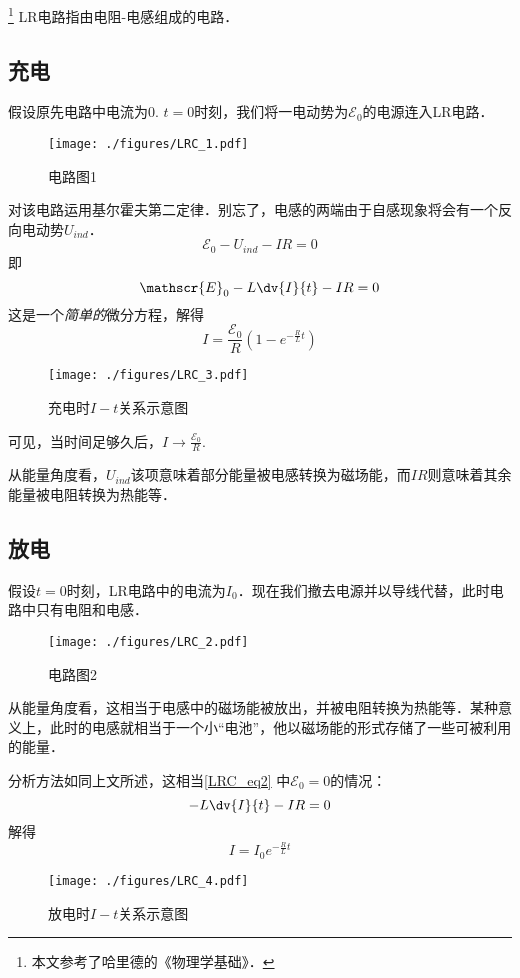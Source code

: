 
\footnote{本文参考了哈里德的《物理学基础》．}
LR电路指由电阻-电感组成的电路．

\subsection{充电}
假设原先电路中电流为$0$. $t=0$时刻，我们将一电动势为$\mathscr{E}_0$的电源连入LR电路．
\begin{figure}[ht]
\centering
\texttt{[image: ./figures/LRC\_1.pdf]}
\caption{电路图1} \label{LRC_fig1}
\end{figure}

对该电路运用基尔霍夫第二定律．别忘了，电感的两端由于自感现象将会有一个反向电动势$U_{ind}$．
$$
\mathscr{E}_0 - U_{ind} - IR = 0
$$
即
\begin{equation}\label{LRC_eq2}
\mathscr{E}_0 - L\dv{I}{t} - IR = 0
\end{equation}
这是一个\textsl{简单的}微分方程，解得
\begin{equation}\label{LRC_eq1}
I = \frac{\mathscr{E}_0}{R} (1-e^{-\frac{R}{L}t})
\end{equation}

\begin{figure}[ht]
\centering
\texttt{[image: ./figures/LRC\_3.pdf]}
\caption{充电时$I-t$关系示意图} \label{LRC_fig3}
\end{figure}
可见，当时间足够久后，$I\to\frac{\mathscr{E_0}}{R}$.

从能量角度看，$U_{ind}$该项意味着部分能量被电感转换为磁场能，而$IR$则意味着其余能量被电阻转换为热能等．

\subsection{放电}
假设$t=0$时刻，LR电路中的电流为$I_0$．现在我们撤去电源并以导线代替，此时电路中只有电阻和电感．
\begin{figure}[ht]
\centering
\texttt{[image: ./figures/LRC\_2.pdf]}
\caption{电路图2} \label{LRC_fig2}
\end{figure}
从能量角度看，这相当于电感中的磁场能被放出，并被电阻转换为热能等．某种意义上，此时的电感就相当于一个小“电池”，他以磁场能的形式存储了一些可被利用的能量．

分析方法如同上文所述，这相当\autoref{LRC_eq2}  中$\mathscr{E}_0=0$的情况：
\begin{equation}
- L\dv{I}{t} - IR = 0
\end{equation}
解得
\begin{equation}
I = I_0 e^{-\frac{R}{L}t}
\end{equation}
\begin{figure}[ht]
\centering
\texttt{[image: ./figures/LRC\_4.pdf]}
\caption{放电时$I-t$关系示意图} \label{LRC_fig4}
\end{figure}
